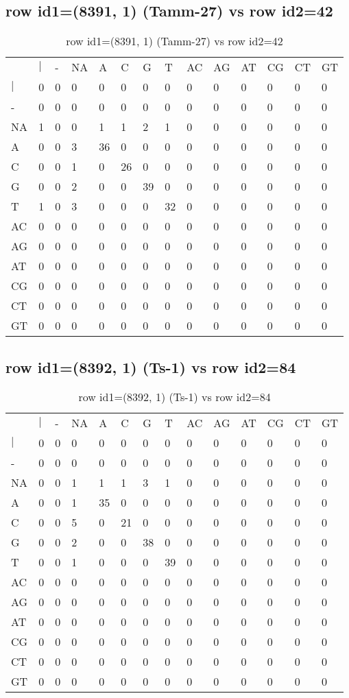 \subsection{row id1=(8391, 1) (Tamm-27) vs row id2=42}
\begin{center}
\begin{longtable}{|l|l|l|l|l|l|l|l|l|l|l|l|l|l|}
\caption{row id1=(8391, 1) (Tamm-27) vs row id2=42} \label{table_dm638}\\
\hline
\\
\hline
&$|$&-&NA&A&C&G&T&AC&AG&AT&CG&CT&GT\\
$|$&0&0&0&0&0&0&0&0&0&0&0&0&0\\
-&0&0&0&0&0&0&0&0&0&0&0&0&0\\
NA&1&0&0&1&1&2&1&0&0&0&0&0&0\\
A&0&0&3&36&0&0&0&0&0&0&0&0&0\\
C&0&0&1&0&26&0&0&0&0&0&0&0&0\\
G&0&0&2&0&0&39&0&0&0&0&0&0&0\\
T&1&0&3&0&0&0&32&0&0&0&0&0&0\\
AC&0&0&0&0&0&0&0&0&0&0&0&0&0\\
AG&0&0&0&0&0&0&0&0&0&0&0&0&0\\
AT&0&0&0&0&0&0&0&0&0&0&0&0&0\\
CG&0&0&0&0&0&0&0&0&0&0&0&0&0\\
CT&0&0&0&0&0&0&0&0&0&0&0&0&0\\
GT&0&0&0&0&0&0&0&0&0&0&0&0&0\\
\hline
\end{longtable}
\end{center}

\subsection{row id1=(8392, 1) (Ts-1) vs row id2=84}
\begin{center}
\begin{longtable}{|l|l|l|l|l|l|l|l|l|l|l|l|l|l|}
\caption{row id1=(8392, 1) (Ts-1) vs row id2=84} \label{table_dm640}\\
\hline
\\
\hline
&$|$&-&NA&A&C&G&T&AC&AG&AT&CG&CT&GT\\
$|$&0&0&0&0&0&0&0&0&0&0&0&0&0\\
-&0&0&0&0&0&0&0&0&0&0&0&0&0\\
NA&0&0&1&1&1&3&1&0&0&0&0&0&0\\
A&0&0&1&35&0&0&0&0&0&0&0&0&0\\
C&0&0&5&0&21&0&0&0&0&0&0&0&0\\
G&0&0&2&0&0&38&0&0&0&0&0&0&0\\
T&0&0&1&0&0&0&39&0&0&0&0&0&0\\
AC&0&0&0&0&0&0&0&0&0&0&0&0&0\\
AG&0&0&0&0&0&0&0&0&0&0&0&0&0\\
AT&0&0&0&0&0&0&0&0&0&0&0&0&0\\
CG&0&0&0&0&0&0&0&0&0&0&0&0&0\\
CT&0&0&0&0&0&0&0&0&0&0&0&0&0\\
GT&0&0&0&0&0&0&0&0&0&0&0&0&0\\
\hline
\end{longtable}
\end{center}

